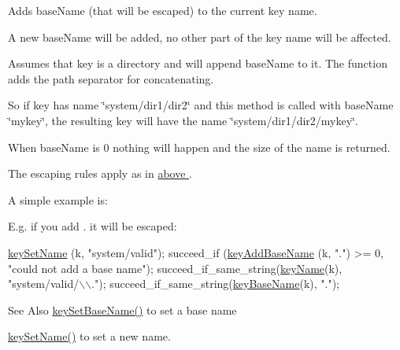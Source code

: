 Adds {\ttfamily base\-Name} (that will be escaped) to the current key name. 

A new base\-Name will be added, no other part of the key name will be affected.

Assumes that {\ttfamily key} is a directory and will append {\ttfamily base\-Name} to it. The function adds the path separator for concatenating.

So if {\ttfamily key} has name {\ttfamily \char`\"{}system/dir1/dir2\char`\"{}} and this method is called with {\ttfamily base\-Name} {\ttfamily \char`\"{}mykey\char`\"{}}, the resulting key will have the name {\ttfamily \char`\"{}system/dir1/dir2/mykey\char`\"{}}.

When {\ttfamily base\-Name} is 0 nothing will happen and the size of the name is returned.

The escaping rules apply as in \hyperlink{group__keyname}{above }.

A simple example is\-: 
 E.\-g. if you add . it will be escaped\-: 
\begin{DoxyCodeInclude}
\hyperlink{group__keyname_ga7699091610e7f3f43d2949514a4b35d9}{keySetName} (k, \textcolor{stringliteral}{"system/valid"});
succeed\_if (\hyperlink{group__keyname_gaa942091fc4bd5c2699e49ddc50829524}{keyAddBaseName} (k, \textcolor{stringliteral}{"."}) >= 0, \textcolor{stringliteral}{"could not add a base
       name"});
succeed\_if\_same\_string(\hyperlink{group__keyname_ga8e805c726a60da921d3736cda7813513}{keyName}(k), \textcolor{stringliteral}{"system/valid/\(\backslash\)\(\backslash\)."});
succeed\_if\_same\_string(\hyperlink{group__keyname_gaaff35e7ca8af5560c47e662ceb9465f5}{keyBaseName}(k), \textcolor{stringliteral}{"."});
\end{DoxyCodeInclude}
 \begin{DoxySeeAlso}{See Also}
\hyperlink{group__keyname_ga6e804bd453f98c28b0ff51430d1df407}{key\-Set\-Base\-Name()} to set a base name 

\hyperlink{group__keyname_ga7699091610e7f3f43d2949514a4b35d9}{key\-Set\-Name()} to set a new name.
\end{DoxySeeAlso}

